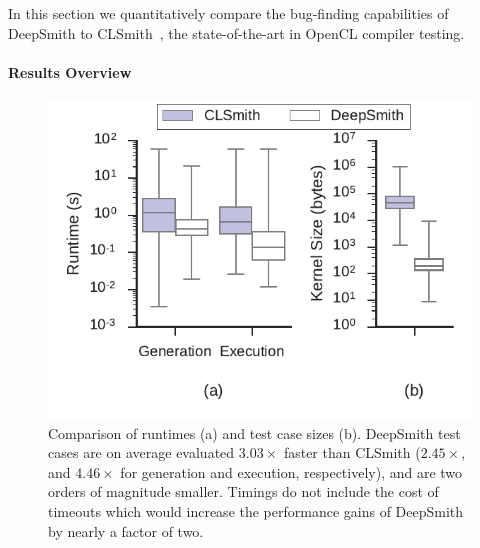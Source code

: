 In this section we quantitatively compare the bug-finding capabilities of DeepSmith to CLSmith~\cite{Lidbury2015a}, the state-of-the-art in OpenCL compiler testing.

\paragraph{Results Overview}

\begin{table}
  \scriptsize %
  \centering %
  
  \caption{%
    Results from 48 hours of testing using CLSmith and DeepSmith. Testbed \#. as per Table~\ref{tab:platforms}. $\pm$ denotes optimizations off ($-$) vs on ($+$). The remaining columns denote the number of build crash (\bc), build timeout (\bto), build failure (\abf), runtime crash (\arc), wrong-output (\awo), and pass (\textbf{\cmark}) results. %
  }
  \label{tab:megatable}
\end{table}

\begin{figure}
  \centering %
  \includegraphics[width=\columnwidth]{build/img/vs-clsmith}%
  \vspace{-1em}
  \caption{%
    Comparison of runtimes (a) and test case sizes (b). DeepSmith test cases are on average evaluated $3.03\times$ faster than CLSmith ($2.45\times$, and $4.46\times$ for generation and execution, respectively), and are two orders of magnitude smaller. Timings do not include the cost of timeouts which would increase the performance gains of DeepSmith by nearly a factor of two.
  }%
  \label{fig:vs-clsmith} %
\end{figure}

